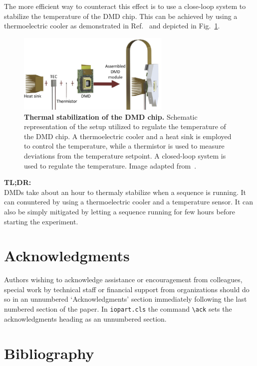 \documentclass[12pt]{iopart}
\begin{document}
The more efficient way to counteract this effect is to use a
close-loop system to stabilize the temperature of the DMD chip.
This can be achieved by using a thermoelectric cooler
as demonstrated in Ref.~\cite{Rudolf2021thermal}
and depicted in Fig.~\ref{fig:decorr_T}.

\begin{figure}
  \centering
  \includegraphics[width = 0.65\textwidth]{images/Cizmar_1.pdf}
  \caption{
    \textbf{Thermal stabilization of the DMD chip.}
    Schematic representation of the setup utilized to regulate the temperature of the DMD chip.
    A thermoelectric cooler and a heat sink is employed to control the temperature,
    while a thermistor is used to measure deviations from the temperature setpoint.
    A closed-loop system is used to regulate the temperature.
    Image adapted from~\cite{Rudolf2021thermal}.
  }
  \label{fig:decorr_T}
\end{figure}

\begin{tldr}
  \textbf{TL;DR:}\\
  DMDs take about an hour to thermaly stabilize when a sequence is running.
  It can conuntered by using a thermoelectric cooler
  and a temperature sensor.
  It can also be simply mitigated by letting a sequence running for few hours
  before starting the experiment.
\end{tldr}




\section{Acknowledgments}
Authors wishing to acknowledge assistance or encouragement from
colleagues, special work by technical staff or financial support from
organizations should do so in an unnumbered `Acknowledgments' section
immediately following the last numbered section of the paper. In \verb"iopart.cls" the
command \verb"\ack" sets the acknowledgments heading as an unnumbered
section.

\section{Bibliography}




\end{document}
